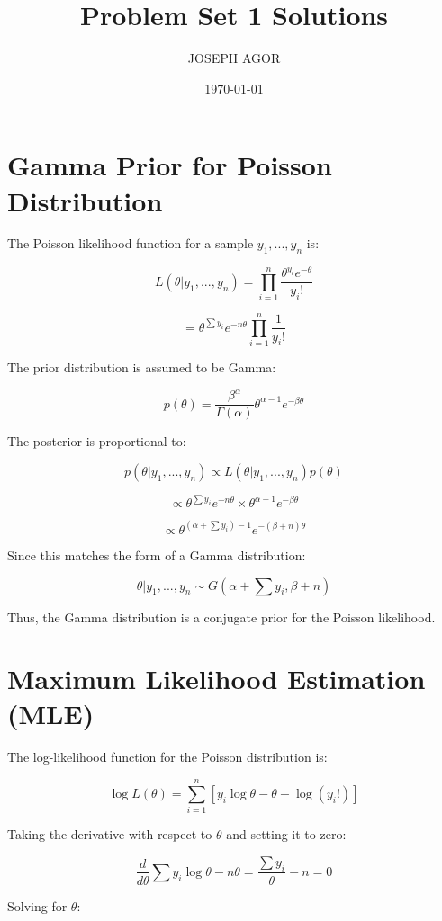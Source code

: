 \documentclass{article}
\begin{document}
\title{Problem Set 1 Solutions}
\author{JOSEPH AGOR}
\date{\today}

\section{Gamma Prior for Poisson Distribution}

The Poisson likelihood function for a sample $y_1, ..., y_n$ is:

\[
L(\theta | y_1, ..., y_n) = \prod_{i=1}^{n} \frac{\theta^{y_i} e^{-\theta}}{y_i!}
\]

\[
= \theta^{\sum y_i} e^{-n\theta} \prod_{i=1}^{n} \frac{1}{y_i!}
\]

The prior distribution is assumed to be Gamma:

\[
p(\theta) = \frac{\beta^\alpha}{\Gamma(\alpha)} \theta^{\alpha - 1} e^{-\beta\theta}
\]

The posterior is proportional to:

\[
p(\theta | y_1, ..., y_n) \propto L(\theta | y_1, ..., y_n) p(\theta)
\]

\[
\propto \theta^{\sum y_i} e^{-n\theta} \times \theta^{\alpha - 1} e^{-\beta\theta}
\]

\[
\propto \theta^{(\alpha + \sum y_i) - 1} e^{-(\beta + n)\theta}
\]

Since this matches the form of a Gamma distribution:

\[
\theta | y_1, ..., y_n \sim G(\alpha + \sum y_i, \beta + n)
\]

Thus, the Gamma distribution is a conjugate prior for the Poisson likelihood.

\section{Maximum Likelihood Estimation (MLE)}

The log-likelihood function for the Poisson distribution is:

\[
\log L(\theta) = \sum_{i=1}^{n} \left[ y_i \log \theta - \theta - \log (y_i!) \right]
\]

Taking the derivative with respect to $\theta$ and setting it to zero:

\[
\frac{d}{d\theta} \sum y_i \log \theta - n\theta = \frac{\sum y_i}{\theta} - n = 0
\]

Solving for $\theta$:
\end{document}
